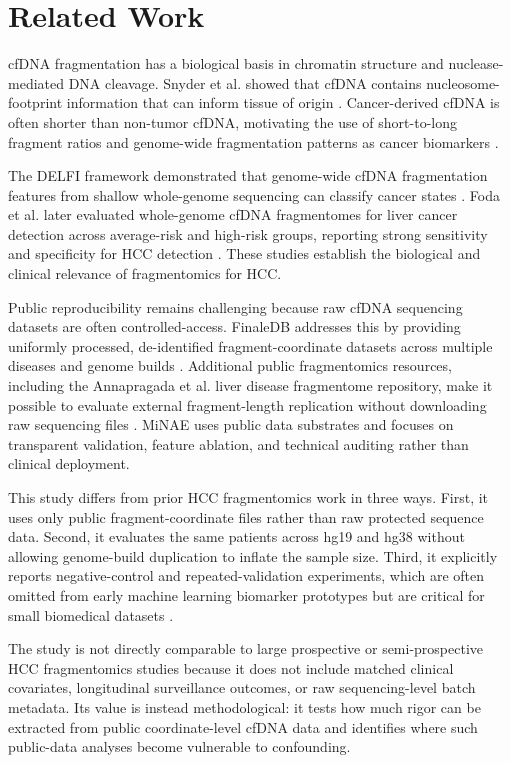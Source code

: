 \documentclass[conference]{IEEEtran}
\begin{document}
\section{Related Work}
cfDNA fragmentation has a biological basis in chromatin structure and nuclease-mediated DNA cleavage. Snyder et al. showed that cfDNA contains nucleosome-footprint information that can inform tissue of origin \cite{snyder2016cellfree}. Cancer-derived cfDNA is often shorter than non-tumor cfDNA, motivating the use of short-to-long fragment ratios and genome-wide fragmentation patterns as cancer biomarkers \cite{mouliere2011fragmentation,cristiano2019genomewide}.

The DELFI framework demonstrated that genome-wide cfDNA fragmentation features from shallow whole-genome sequencing can classify cancer states \cite{cristiano2019genomewide}. Foda et al. later evaluated whole-genome cfDNA fragmentomes for liver cancer detection across average-risk and high-risk groups, reporting strong sensitivity and specificity for HCC detection \cite{foda2023detecting}. These studies establish the biological and clinical relevance of fragmentomics for HCC.

Public reproducibility remains challenging because raw cfDNA sequencing datasets are often controlled-access. FinaleDB addresses this by providing uniformly processed, de-identified fragment-coordinate datasets across multiple diseases and genome builds \cite{zheng2021finaledb}. Additional public fragmentomics resources, including the Annapragada et al. liver disease fragmentome repository, make it possible to evaluate external fragment-length replication without downloading raw sequencing files \cite{annapragada2026cirrhosis}. MiNAE uses public data substrates and focuses on transparent validation, feature ablation, and technical auditing rather than clinical deployment.

This study differs from prior HCC fragmentomics work in three ways. First, it uses only public fragment-coordinate files rather than raw protected sequence data. Second, it evaluates the same patients across hg19 and hg38 without allowing genome-build duplication to inflate the sample size. Third, it explicitly reports negative-control and repeated-validation experiments, which are often omitted from early machine learning biomarker prototypes but are critical for small biomedical datasets \cite{varma2006bias,collins2015tripod}.

The study is not directly comparable to large prospective or semi-prospective HCC fragmentomics studies because it does not include matched clinical covariates, longitudinal surveillance outcomes, or raw sequencing-level batch metadata. Its value is instead methodological: it tests how much rigor can be extracted from public coordinate-level cfDNA data and identifies where such public-data analyses become vulnerable to confounding.
\end{document}
